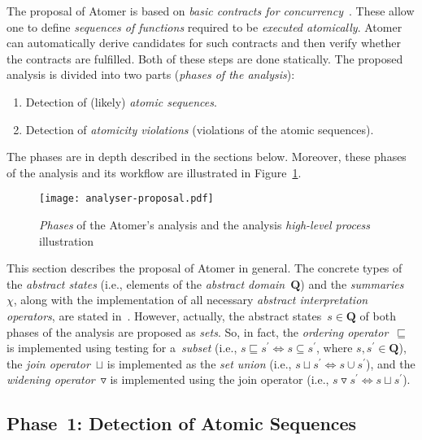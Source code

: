 \documentclass{ExcelAtFIT}
\theoremstyle{definition}
\begin{document}
The proposal of Atomer is based on \emph{basic contracts for concurrency}~\cite{harmimBP, contracts2017}. These allow one to define \emph{sequences of functions} required to be \emph{executed atomically}. Atomer can automatically derive candidates for such contracts and then verify whether the contracts are fulfilled. Both of these steps are done statically. The proposed analysis is divided into two parts (\emph{phases of the analysis}):
\vspace{-.5em}
\begin{enumerate}[label={\textbf{Phase~\arabic*}:}, leftmargin=4.2em]
    \item Detection of (likely) \emph{atomic sequences}.

    \item Detection of \emph{atomicity violations} (violations of the atomic sequences).
\end{enumerate}
\vspace{-.5em}
The phases are in depth described in the sections below. Moreover, these phases of the analysis and its workflow are illustrated in Figure~\ref{fig:atomerPhasesSequences}.

\begin{figure}[hbt]
    \centering
    \texttt{[image: analyser-proposal.pdf]}
    \caption{\emph{Phases} of the Atomer's analysis and the analysis \emph{high-level process} illustration}
    \label{fig:atomerPhasesSequences}
\end{figure}

This section describes the proposal of Atomer in general. The concrete types of the \emph{abstract states} (i.e., elements of the \emph{abstract domain}~$ \boldsymbol{Q} $) and the \emph{summaries}~$ \chi $, along with the implementation of all necessary \emph{abstract interpretation operators}, are stated in~\cite{harmimBP}. However, actually, the abstract states~$ s \in \boldsymbol{Q} $ of both phases of the analysis are proposed as \emph{sets}. So, in fact, the \emph{ordering operator}~$ \sqsubseteq $ is implemented using testing for a~\emph{subset} (i.e., $ s \sqsubseteq s^\prime \Leftrightarrow s \subseteq s^\prime $, where $ s, s^\prime \in \boldsymbol{Q} $), the \emph{join operator}~$ \sqcup $ is implemented as the \emph{set union} (i.e., $ s \sqcup s^\prime \Leftrightarrow s \cup s^\prime $), and the \emph{widening operator}~$ \triangledown $ is implemented using the join operator (i.e., $ s \triangledown s^\prime \Leftrightarrow s \sqcup s^\prime $).

\subsection{Phase~1: Detection of Atomic Sequences}
\end{document}
